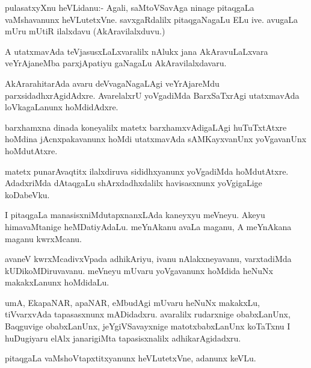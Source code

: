 \documentclass{article}
\begin{document}
\begin{mn}
pulasatxyXnu heVLidanu:- Agali, saMtoVSavAga ninage pitaqgaLa
vaMshavanunx heVLutetxVne. savxgaRdalilx pitaqgaNagaLu ELu
ive. avugaLa mUru mUtiR ilalxdavu (AkAravilalxduvu.)
\end{mn}

\begin{mn}
A utatxmavAda teVjasusxLaLxvaralilx nAlukx jana AkAravuLaLxvara
veYrAjaneMba parxjApatiyu gaNagaLu AkAravilalxdavaru.
\end{mn}

\begin{mn}%
AkArarahitarAda avaru deVvagaNagaLAgi veYrAjareMdu
parxsidadhxrAgidAdxre. AvarelalxrU yoVgadiMda BarxSaTxrAgi utatxmavAda
loVkagaLanunx hoMdidAdxre.
\end{mn}

\begin{mn}
barxhamxna dinada koneyalilx matetx barxhamxvAdigaLAgi huTuTxtAtxre
hoMdina jAcnxpakavanunx hoMdi utatxmavAda sAMKayxvanUnx yoVgavanUnx hoMdutAtxre.
\end{mn}

\begin{mn}
matetx punarAvaqtitx ilalxdiruva sididhxyanunx yoVgadiMda
hoMdutAtxre. AdadxriMda dAtaqgaLu shArxdadhxdalilx havisasxnunx
yoVgigaLige koDabeVku.
\end{mn}

\begin{mn}
I pitaqgaLa manasisxniMdutapxnanxLAda kaneyxyu meVneyu. Akeyu
himavaMtanige heMDatiyAdaLu. meYnAkanu avaLa maganu, A meYnAkana
maganu kwrxMcanu.
\end{mn}

\begin{mn}%
avaneV kwrxMcadivxVpada adhikAriyu, ivanu nAlakxneyavanu, varxtadiMda
kUDikoMDiruvavanu. meVneyu mUvaru yoVgavanunx hoMdida heNuNx
makakxLanunx hoMdidaLu.
\end{mn}

\begin{mn}%
umA, EkapaNAR, apaNAR, eMbudAgi mUvaru heNuNx makakxLu, tiVvarxvAda
tapasasxnunx mADidadxru. avaralilx rudarxnige obabxLanUnx, Baqguvige
obabxLanUnx, jeYgiVSavayxnige matotxbabxLanUnx koTaTxnu I huDugiyaru
elAlx janarigiMta tapasisxnalilx adhikarAgidadxru.
\end{mn}

\begin{mn}%
pitaqgaLa vaMshoVtapxtitxyanunx heVLutetxVne, adanunx keVLu.
\end{mn}
\end{document}

